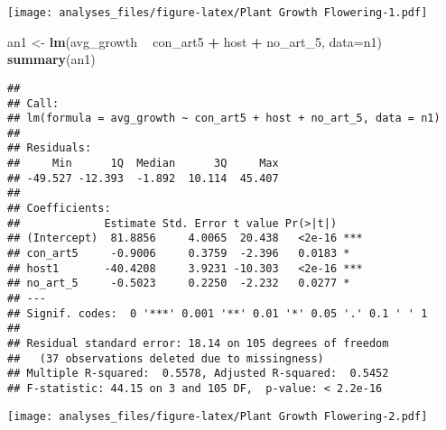 \documentclass[]{article}
\newenvironment{Shaded}{\begin{snugshade}}{\end{snugshade}}
\newcommand{\KeywordTok}[1]{\textcolor[rgb]{0.13,0.29,0.53}{\textbf{#1}}}
\newcommand{\DataTypeTok}[1]{\textcolor[rgb]{0.13,0.29,0.53}{#1}}
\newcommand{\DecValTok}[1]{\textcolor[rgb]{0.00,0.00,0.81}{#1}}
\newcommand{\StringTok}[1]{\textcolor[rgb]{0.31,0.60,0.02}{#1}}
\newcommand{\CommentTok}[1]{\textcolor[rgb]{0.56,0.35,0.01}{\textit{#1}}}
\newcommand{\OperatorTok}[1]{\textcolor[rgb]{0.81,0.36,0.00}{\textbf{#1}}}
\newcommand{\NormalTok}[1]{#1}
\begin{document}
\begin{Shaded}
\end{Shaded}

\texttt{[image: analyses\_files/figure-latex/Plant Growth Flowering-1.pdf]}

\begin{Shaded}
\begin{Highlighting}[]
\NormalTok{an1 <-}\StringTok{ }\KeywordTok{lm}\NormalTok{(avg_growth }\OperatorTok{~}\StringTok{  }\NormalTok{con_art5 }\OperatorTok{+}\StringTok{ }\NormalTok{host }\OperatorTok{+}\StringTok{ }\NormalTok{no_art_}\DecValTok{5}\NormalTok{, }\DataTypeTok{data=}\NormalTok{n1)}
\KeywordTok{summary}\NormalTok{(an1)}
\end{Highlighting}
\end{Shaded}

\begin{verbatim}
## 
## Call:
## lm(formula = avg_growth ~ con_art5 + host + no_art_5, data = n1)
## 
## Residuals:
##     Min      1Q  Median      3Q     Max 
## -49.527 -12.393  -1.892  10.114  45.407 
## 
## Coefficients:
##             Estimate Std. Error t value Pr(>|t|)    
## (Intercept)  81.8856     4.0065  20.438   <2e-16 ***
## con_art5     -0.9006     0.3759  -2.396   0.0183 *  
## host1       -40.4208     3.9231 -10.303   <2e-16 ***
## no_art_5     -0.5023     0.2250  -2.232   0.0277 *  
## ---
## Signif. codes:  0 '***' 0.001 '**' 0.01 '*' 0.05 '.' 0.1 ' ' 1
## 
## Residual standard error: 18.14 on 105 degrees of freedom
##   (37 observations deleted due to missingness)
## Multiple R-squared:  0.5578, Adjusted R-squared:  0.5452 
## F-statistic: 44.15 on 3 and 105 DF,  p-value: < 2.2e-16
\end{verbatim}

\begin{Shaded}
\end{Shaded}

\texttt{[image: analyses\_files/figure-latex/Plant Growth Flowering-2.pdf]}

\begin{Shaded}
\end{Shaded}
\end{document}
